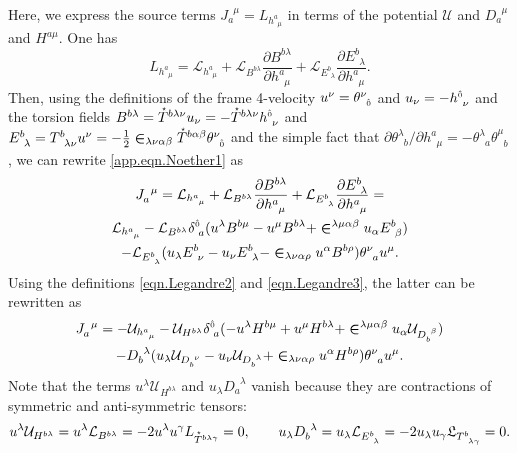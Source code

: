 \documentclass[
10pt, %
a4paper, %
oneside, %
headinclude,footinclude, %
BCOR5mm, %
]{scrartcl}
\newcommand{\tetrsymbol}{h}
\newcommand{\itetrsymbol}{\theta}
\newcommand{\itetr}[2]{\itetrsymbol^{#1}_{\phantom{#1}#2}}
\newcommand{\tetr}[2]{\tetrsymbol^{#1}_{\phantom{#1}#2}}
\newcommand{\Tors}[2]{T^{#1}_{\phantom{a}#2}}
\newcommand{\ET}[2]{E^{#1}_{\phantom{#1}#2}}	%
\newcommand{\eT}[2]{D_{#1}^{\phantom{#1}#2}}	%
\newcommand{\BT}[2]{B^{#1#2}}	%
\newcommand{\hT}[2]{H^{#1#2}}	%
\newcommand{\Laghodge}{L}%
\newcommand{\Lagtors}{\mathfrak{L}}%
\newcommand{\LagBE}{\mathcal{L}}%
\newcommand{\LagST}{\mathcal{U}}%
\newcommand{\LCsymb}{\bm{\in}}    %
\newcommand{\HDT}[1]{\accentset{\star}{T}^{#1}}
\newcommand{\KD}[2]{\delta^{#1}_{\,\,#2}}
\newcommand{\NC}[2]{J^{\phantom{#1}#2}_{#1}}
\newcommand{\indlat}[1]{\hat{\mathsmaller{#1}}}
\begin{document}
Here, we express the source terms $ \NC{a}{\mu} = \Laghodge_{\tetr{a}{\mu}} $ in terms of the 
potential $ \LagST $ and $ \eT{a}{\mu} $ and $ \hT{a}{\mu} $. One has
\begin{equation}\label{app.eqn.Noether1}
	\Laghodge_{\tetr{a}{\mu}} = \LagBE_{\tetr{a}{\mu}} 
	+ \LagBE_{\BT{b}{\lambda}} \frac{\partial \BT{b}{\lambda}}{\partial \tetr{a}{\mu}}
	+ \LagBE_{\ET{b}{\lambda}} \frac{\partial \ET{b}{\lambda}}{\partial \tetr{a}{\mu}}.
\end{equation}
Then, using the definitions of the frame 4-velocity $ u^\nu = \itetr{\nu}{\indlat{0}} $ and $ u_\nu 
= 
-\tetr{\indlat{0}}{\nu} $ and the torsion fields
$ \BT{b}{\lambda} = \HDT{b\lambda\nu} u_\nu = - \HDT{b\lambda\nu} \tetr{\indlat{0}}{\nu}$ and 
$ \ET{b}{\lambda} = \Tors{b}{\lambda\nu} u^\nu = 
-\frac12\LCsymb_{\lambda\nu\alpha\beta}\HDT{b\alpha\beta} \itetr{\nu}{\indlat{0}}$ and the simple 
fact 
that $ \partial\itetr{\lambda}{b}/\partial\tetr{a}{\mu} = -\itetr{\lambda}{a}\itetr{\mu}{b} $, we 
can rewrite \eqref{app.eqn.Noether1} as
\begin{multline}
	\NC{a}{\mu} = \LagBE_{\tetr{a}{\mu}} 
	+ \LagBE_{\BT{b}{\lambda}} \frac{\partial \BT{b}{\lambda}}{\partial \tetr{a}{\mu}}
	+ \LagBE_{\ET{b}{\lambda}} \frac{\partial \ET{b}{\lambda}}{\partial \tetr{a}{\mu}} = \\
	\LagBE_{\tetr{a}{\mu}} - \LagBE_{\BT{b}{\lambda}} \KD{\indlat{0}}{a}
	(u^\lambda \BT{b}{\mu} - u^\mu \BT{b}{\lambda}+\LCsymb^{\lambda\mu\alpha\beta} u_\alpha  
	\ET{b}{\beta}) \\
	-\LagBE_{\ET{b}{\lambda}} (u_\lambda \ET{b}{\nu} - u_\nu \ET{b}{\lambda} - 
	\LCsymb_{\lambda\nu\alpha\rho}u^\alpha\BT{b}{\rho})\itetr{\nu}{a}u^\mu.
\end{multline}
Using the definitions \eqref{eqn.Legandre2} and \eqref{eqn.Legandre3}, the latter can be rewritten 
as
\begin{multline}
	\NC{a}{\mu} =
	-\LagST_{\tetr{a}{\mu}} 
	- \LagST_{\hT{b}{\lambda}} \KD{\indlat{0}}{a}
	(-u^\lambda \hT{b}{\mu} + u^\mu \hT{b}{\lambda}+\LCsymb^{\lambda\mu\alpha\beta} u_\alpha 
	\LagST_{\eT{b}{\beta}}) \\
	-\eT{b}{\lambda} (u_\lambda \LagST_{\eT{b}{\nu}} - u_\nu \LagST_{\eT{b}{\lambda}} + 
	\LCsymb_{\lambda\nu\alpha\rho}u^\alpha\hT{b}{\rho})\itetr{\nu}{a}u^\mu.
\end{multline}
Note that the terms $ u^\lambda \LagST_{\hT{b}{\lambda}} $ and $ u_\lambda\eT{a}{\lambda} $ vanish 
because they are contractions of symmetric and anti-symmetric tensors: 
\begin{equation}
u^\lambda \LagST_{\hT{b}{\lambda}} = u^\lambda \LagBE_{\BT{b}{\lambda}} = -2 u^\lambda 
u^\gamma \Laghodge_{\HDT{b\lambda\gamma}} = 0, 
\qquad
u_\lambda\eT{b}{\lambda} = u_\lambda\LagBE_{\ET{b}{\lambda}} = -2 u_\lambda u_\gamma 
\Lagtors_{\Tors{b}{\lambda\gamma}} = 0.
\end{equation}
\end{document}
